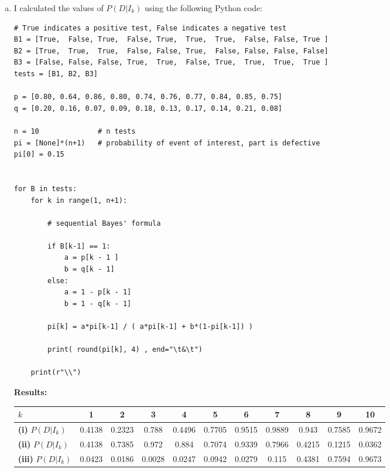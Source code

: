 \documentclass[11pt]{extarticle}
\begin{document}
\begin{enumerate}[(a)]

\item I calculated the values of $P(D|I_k)$ using the following Python code:

\scriptsize
\begin{verbatim}
# True indicates a positive test, False indicates a negative test
B1 = [True,  False, True,  False, True,  True,  True,  False, False, True ]
B2 = [True,  True,  True,  False, False, True,  False, False, False, False]
B3 = [False, False, False, True,  True,  False, True,  True,  True,  True ]
tests = [B1, B2, B3]

p = [0.80, 0.64, 0.86, 0.80, 0.74, 0.76, 0.77, 0.84, 0.85, 0.75]
q = [0.20, 0.16, 0.07, 0.09, 0.18, 0.13, 0.17, 0.14, 0.21, 0.08]

n = 10              # n tests
pi = [None]*(n+1)   # probability of event of interest, part is defective
pi[0] = 0.15


for B in tests:
    for k in range(1, n+1):

        # sequential Bayes' formula 

        if B[k-1] == 1: 
            a = p[k - 1 ]
            b = q[k - 1]
        else:
            a = 1 - p[k - 1]
            b = 1 - q[k - 1]

        pi[k] = a*pi[k-1] / ( a*pi[k-1] + b*(1-pi[k-1]) ) 

        print( round(pi[k], 4) , end="\t&\t")
  
    print(r"\\")
\end{verbatim}
\normalsize

\textbf{Results:}

\begin{table}[H]
\centering
\scriptsize
\begin{tabular}{l|cccccccccc}
\toprule
$k$ & 1	&	2	&	3	&	4	&	5	&	6	&	7	&	8	&	9 & 10		\\
\midrule
\textbf{(i)} $P(D|I_k)$ & 0.4138	&	0.2323	&	0.788	&	0.4496	&	0.7705	&	0.9515	&	0.9889	&	0.943	&	0.7585	&	0.9672		\\
\textbf{(ii)} $P(D|I_k)$ & 0.4138	&	0.7385	&	0.972	&	0.884	&	0.7074	&	0.9339	&	0.7966	&	0.4215	&	0.1215	&	0.0362		\\
\textbf{(iii)} $P(D|I_k)$ &  0.0423	&	0.0186	&	0.0028	&	0.0247	&	0.0942	&	0.0279	&	0.115	&	0.4381	&	0.7594	&	0.9673		\\
\toprule
\end{tabular}
\end{table}


\end{enumerate}
\end{document}

